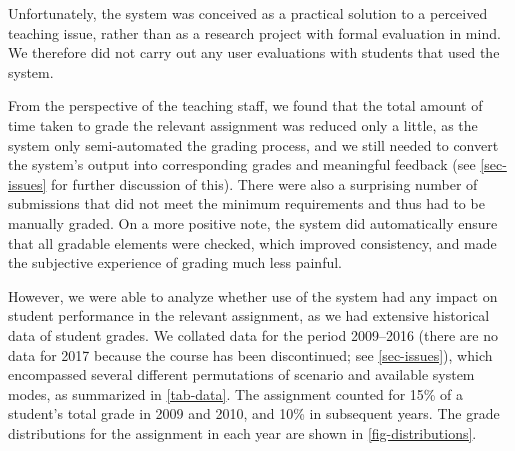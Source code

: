 \documentclass[sigconf, authordraft, capitalise]{acmart}
\begin{document}
Unfortunately, the system was conceived as a practical solution to a perceived teaching issue, rather than as a research project with formal evaluation in mind. We therefore did not carry out any user evaluations with students that used the system.

From the perspective of the teaching staff, we found that the total amount of time taken to grade the relevant assignment was reduced only a little, as the system only semi-automated the grading process, and we still needed to convert the system's output into corresponding grades and meaningful feedback (see \cref{sec-issues} for further discussion of this). There were also a surprising number of submissions that did not meet the minimum requirements and thus had to be manually graded. On a more positive note, the system did automatically ensure that all gradable elements were checked, which improved consistency, and made the subjective experience of grading much less painful.

However, we were able to analyze whether use of the system had any impact on student performance in the relevant assignment, as we had extensive historical data of student grades. We collated data for the period 2009--2016 (there are no data for 2017 because the course has been discontinued; see \cref{sec-issues}), which encompassed several different permutations of scenario and available system modes, as summarized in \cref{tab-data}. The assignment counted for 15\% of a student's total grade in 2009 and 2010, and 10\% in subsequent years. The grade distributions for the assignment in each year are shown in \cref{fig-distributions}.
\end{document}
